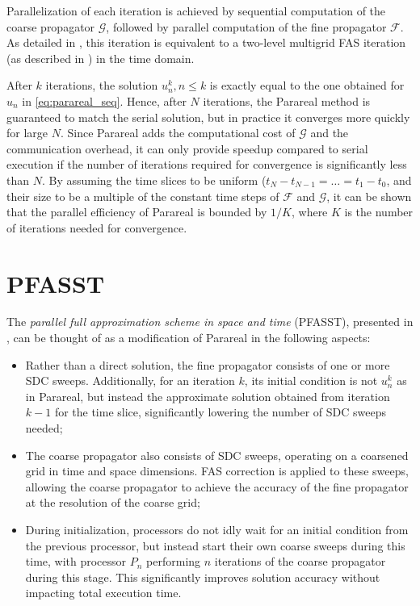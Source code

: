 Parallelization of each iteration is achieved by sequential computation of the coarse propagator \(\mathcal{G}\), followed by parallel computation of the fine propagator \(\mathcal{F}\). As detailed in \cite{gander2007analysis}, this iteration is equivalent to a two-level multigrid FAS iteration (as described in ) in the time domain.

After \(k\) iterations, the solution \(u_n^k, n \leq k\) is exactly equal to the one obtained for \(u_n\) in \ref{eq:parareal_seq}. Hence, after \(N\) iterations, the Parareal method is guaranteed to match the serial solution, but in practice it converges more quickly for large \(N\). Since Parareal adds the computational cost of \(\mathcal{G}\) and the communication overhead, it can only provide speedup compared to serial execution if the number of iterations required for convergence is significantly less than \(N\). By assuming the time slices to be uniform (\(t_N - t_{N-1} = \dots = t_1 - t_0\), and their size to be a multiple of the constant time steps of \(\mathcal{F}\) and \(\mathcal{G}\), it can be shown that the parallel efficiency of Parareal is bounded by \(1/K\), where \(K\) is the number of iterations needed for convergence. \cite{minion2011hybrid}

\section{PFASST}

The \textit{parallel full approximation scheme in space and time} (PFASST), presented in \cite{emmett2012toward}, can be thought of as a modification of Parareal in the following aspects:

\begin{itemize}
    \item Rather than a direct solution, the fine propagator consists of one or more SDC sweeps. Additionally, for an iteration \(k\), its initial condition is not \(u^k_n\) as in Parareal, but instead the approximate solution obtained from iteration \(k-1\) for the time slice, significantly lowering the number of SDC sweeps needed;
    \item The coarse propagator also consists of SDC sweeps, operating on a coarsened grid in time and space dimensions. FAS correction is applied to these sweeps, allowing the coarse propagator to achieve the accuracy of the fine propagator at the resolution of the coarse grid;
    \item During initialization, processors do not idly wait for an initial condition from the previous processor, but instead start their own coarse sweeps during this time, with processor \(P_n\) performing \(n\) iterations of the coarse propagator during this stage. This significantly improves solution accuracy without impacting total execution time.
\end{itemize}

